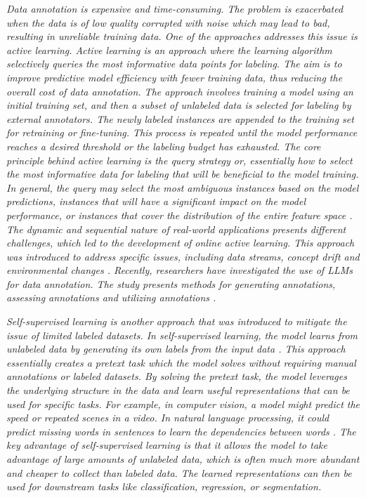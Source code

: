 \documentclass[preprint,12pt]{elsarticle}
\begin{document}
\emph{Data annotation is expensive and time-consuming. The problem is exacerbated when the data is of low quality corrupted with noise which may lead to bad, resulting in unreliable training data. One of the approaches addresses this issue is active learning. Active learning is an approach where the learning algorithm selectively queries the most informative data points for labeling. The aim is to improve predictive model efficiency with fewer training data, thus reducing the overall cost of data annotation. The approach involves training a model using an initial training set, and then a subset of unlabeled data is selected for labeling by external annotators. The newly labeled instances are appended to the training set for retraining or fine-tuning. This process is repeated until the model performance reaches a desired threshold or the labeling budget has exhausted. The core principle behind active learning is the query strategy or, essentially how to select the most informative data for labeling that will be beneficial to the model training. In general, the query may select the most ambiguous instances based on the model predictions, instances that will have a significant impact on the model performance, or instances that cover the distribution of the entire feature space \citep{li_survey_2024}. The dynamic and sequential nature of real-world applications presents different challenges, which led to the development of online active learning. This approach was introduced to address specific issues, including data streams, concept drift and environmental changes \citep{cacciarelli_active_2024}. Recently, researchers have investigated the use of LLMs for data annotation. The study presents methods for generating annotations, assessing annotations and utilizing annotations \citep{tan_large_2024}.}

\emph{Self-supervised learning is another approach that was introduced to mitigate the issue of limited labeled datasets. In self-supervised learning, the model learns from unlabeled data by generating its own labels from the input data \citep{gui_survey_2024}. This approach essentially creates a pretext task which the model solves without requiring manual annotations or labeled datasets. By solving the pretext task, the model leverages the underlying structure in the data and learn useful representations that can be used for specific tasks. For example, in computer vision, a model might predict the speed \citep{altabrawee_stclr_2025} or repeated scenes \citep{altabrawee_repeat_2024} in a video. In natural language processing, it could predict missing words in sentences to learn the dependencies between words \citep{lee_predicting_2021}. The key advantage of self-supervised learning is that it allows the model to take advantage of large amounts of unlabeled data, which is often much more abundant and cheaper to collect than labeled data. The learned representations can then be used for downstream tasks like classification, regression, or segmentation.}
\end{document}
